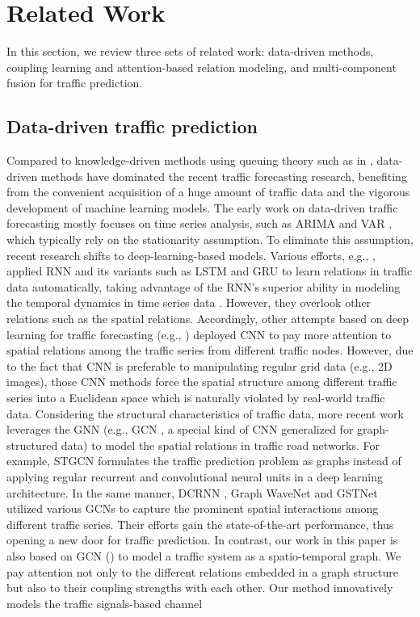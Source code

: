 \section{Related Work}
\label{sec:related_work}
In this section, we review three sets of related work: data-driven methods, coupling learning and attention-based relation modeling, and multi-component fusion for traffic prediction.

\subsection{Data-driven traffic prediction}
Compared to knowledge-driven methods using queuing theory such as in \cite{cascetta2013transportation}, data-driven methods have dominated the recent traffic forecasting research, benefiting from the convenient acquisition of a huge amount of traffic data and the vigorous development of machine learning models. The early work on data-driven traffic forecasting mostly focuses on time series analysis, such as ARIMA \cite{williams2003modeling} and VAR \cite{zivot2006vector}, which typically rely on the stationarity assumption. To eliminate this assumption, recent research shifts to deep-learning-based models. Various efforts, e.g., \cite{zhao2017lstm,ma2015long,bai2020adaptive,pan2020spatio}, applied RNN and its variants such as LSTM \cite{hochreiter1997long} and GRU \cite{cho2014learning} to learn relations in traffic data automatically, taking advantage of the RNN’s superior ability in modeling the temporal dynamics in time series data \cite{connor1994recurrent}. However, they overlook other relations such as the spatial relations. Accordingly, other attempts based on deep learning for traffic forecasting (e.g., \cite{wu2016short,ma2017learning,zhang2017deep}) deployed CNN to pay more attention to spatial relations among the traffic series from different traffic nodes. However, due to the fact that CNN is preferable to manipulating regular grid data (e.g., 2D images), those CNN methods force the spatial structure among different traffic series into a Euclidean space which is naturally violated by real-world traffic data. Considering the structural characteristics of traffic data, more recent work leverages the GNN (e.g., GCN \cite{kipf2016semi}, a special kind of CNN generalized for graph-structured data) to model the spatial relations in traffic road networks. For example, STGCN \cite{yu2017spatio} formulates the traffic prediction problem as graphs instead of applying regular recurrent and convolutional neural units in a deep learning architecture. In the same manner, DCRNN \cite{li2017diffusion}, Graph WaveNet \cite{wu2019graph} and GSTNet \cite{fang2019gstnet} utilized various GCNs to capture the prominent spatial interactions among different traffic series. Their efforts gain the state-of-the-art performance, thus opening a new door for traffic prediction. In contrast, our work in this paper is also based on GCN (\cite{mengzhang2020spatial, song2020spatial}) to model a traffic system as a spatio-temporal graph. We pay attention not only to the different relations embedded in a graph structure but also to their coupling strengths with each other. Our method innovatively models the traffic signals-based channel 